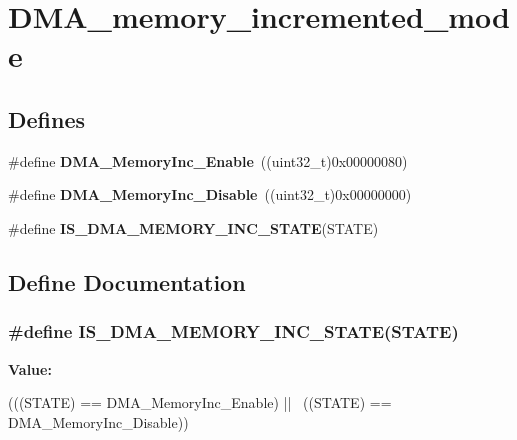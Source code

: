 \hypertarget{group__DMA__memory__incremented__mode}{
\section{DMA\_\-memory\_\-incremented\_\-mode}
\label{group__DMA__memory__incremented__mode}
}
\subsection*{Defines}
\begin{DoxyCompactItemize}
\item 
\hypertarget{group__DMA__memory__incremented__mode_ga4e8cb23d039c74bbbf365d7678835bbb}{
\#define {\bfseries DMA\_\-MemoryInc\_\-Enable}~((uint32\_\-t)0x00000080)}
\label{group__DMA__memory__incremented__mode_ga4e8cb23d039c74bbbf365d7678835bbb}

\item 
\hypertarget{group__DMA__memory__incremented__mode_ga795a277c997048783a383b026f19a5ab}{
\#define {\bfseries DMA\_\-MemoryInc\_\-Disable}~((uint32\_\-t)0x00000000)}
\label{group__DMA__memory__incremented__mode_ga795a277c997048783a383b026f19a5ab}

\item 
\#define {\bfseries IS\_\-DMA\_\-MEMORY\_\-INC\_\-STATE}(STATE)
\end{DoxyCompactItemize}


\subsection{Define Documentation}
\hypertarget{group__DMA__memory__incremented__mode_gaa880f39d499d1e80449cf80381e4eb67}{
\subsubsection[{IS\_\-DMA\_\-MEMORY\_\-INC\_\-STATE}]{\setlength{\rightskip}{0pt plus 5cm}\#define IS\_\-DMA\_\-MEMORY\_\-INC\_\-STATE(STATE)}}
\label{group__DMA__memory__incremented__mode_gaa880f39d499d1e80449cf80381e4eb67}
{\bfseries Value:}
\begin{DoxyCode}
(((STATE) == DMA_MemoryInc_Enable) || \
                                        ((STATE) == DMA_MemoryInc_Disable))
\end{DoxyCode}
